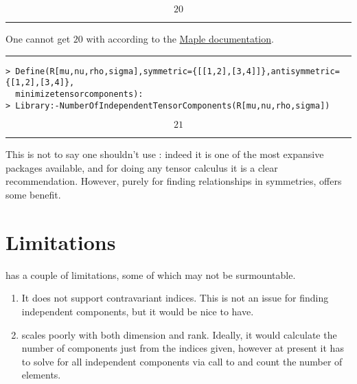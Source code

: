 \documentclass{article}
\begin{document}
\begin{enumerate}
\begin{verbatim}
\end{verbatim}
\[
20
\]
\newline\rule{\linewidth}{0.4pt}
One cannot get $20$ with \verb@Physics@ according to the \href{https://www.maplesoft.com/support/help/Maple/view.aspx?path=updates%2FMaple2018%2FPhysics}{Maple documentation}.
\newline\rule{\linewidth}{0.4pt}
\begin{verbatim}
> Define(R[mu,nu,rho,sigma],symmetric={[[1,2],[3,4]]},antisymmetric={[1,2],[3,4]},
  minimizetensorcomponents):
> Library:-NumberOfIndependentTensorComponents(R[mu,nu,rho,sigma])
\end{verbatim}
\[
21
\]
\newline\rule{\linewidth}{0.4pt}
\end{enumerate}
This is not to say one shouldn't use \verb@Physics@: indeed it is one of the most expansive packages available, and for doing any tensor calculus it is a clear recommendation. However, purely for finding relationships in symmetries, \verb@GraClo@ offers some benefit.

\section{Limitations}
\verb@GraClo@ has a couple of limitations, some of which may not be surmountable.
\begin{enumerate}
\item It does not support contravariant indices. This is not an issue for finding independent components, but it would be nice to have.
\item \verb@NumberOfIndependentComponents@ scales poorly with both dimension and rank. Ideally, it would calculate the number of components just from the indices given, however at present it has to solve for all independent components via call to \verb@IndependentComponents@ and count the number of elements.
\end{enumerate}
\end{document}
